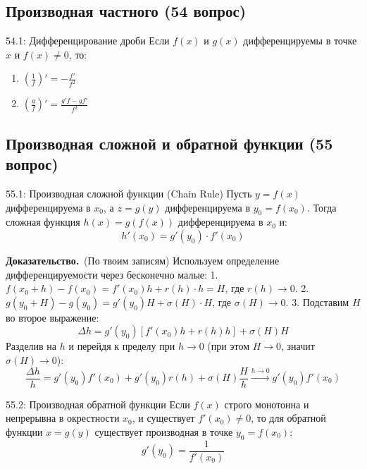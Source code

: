 \documentclass[a4paper,12pt]{article}
\newcommand{\myproof}{\textbf{Доказательство.}\ }
\begin{document}
	
	
	
	\subsection{Производная частного (54 вопрос)}
	
	\begin{theorembox}{54.1: Дифференцирование дроби}
		Если $f(x)$ и $g(x)$ дифференцируемы в точке $x$ и $f(x) \neq 0$, то:
		\begin{enumerate}
			\item $\left( \frac{1}{f} \right)' = -\frac{f'}{f^2}$
			\item $\left( \frac{g}{f} \right)' = \frac{g'f - gf'}{f^2}$
		\end{enumerate}
	\end{theorembox}
	
	
	
	
	
	\vspace{1cm}
	\subsection{Производная сложной и обратной функции (55 вопрос)}
	
	\begin{theorembox}{55.1: Производная сложной функции (Chain Rule)}
		Пусть $y = f(x)$ дифференцируема в $x_0$, а $z = g(y)$ дифференцируема в $y_0 = f(x_0)$. Тогда сложная функция $h(x) = g(f(x))$ дифференцируема в $x_0$ и:
		$$ h'(x_0) = g'(y_0) \cdot f'(x_0) $$
	\end{theorembox}
	
	\myproof (По твоим записям)
	Используем определение дифференцируемости через бесконечно малые:
	1. $f(x_0+h) - f(x_0) = f'(x_0)h + r(h) \cdot h = H$, где $r(h) \to 0$.
	2. $g(y_0+H) - g(y_0) = g'(y_0)H + \sigma(H) \cdot H$, где $\sigma(H) \to 0$.
	3. Подставим $H$ во второе выражение:
	$$ \Delta h = g'(y_0)[f'(x_0)h + r(h)h] + \sigma(H)H $$
	Разделив на $h$ и перейдя к пределу при $h \to 0$ (при этом $H \to 0$, значит $\sigma(H) \to 0$):
	$$ \frac{\Delta h}{h} = g'(y_0)f'(x_0) + g'(y_0)r(h) + \sigma(H)\frac{H}{h} \xrightarrow{h \to 0} g'(y_0)f'(x_0) $$
	
	\begin{theorembox}{55.2: Производная обратной функции}
		Если $f(x)$ строго монотонна и непрерывна в окрестности $x_0$, и существует $f'(x_0) \neq 0$, то для обратной функции $x = g(y)$ существует производная в точке $y_0 = f(x_0)$:
		$$ g'(y_0) = \frac{1}{f'(x_0)} $$
	\end{theorembox}
	
\end{document}
